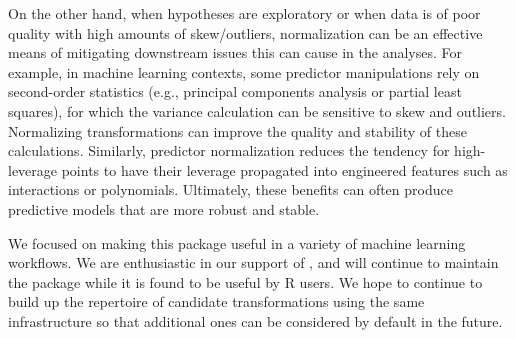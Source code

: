On the other hand, when hypotheses are exploratory or when data is of
poor quality with high amounts of skew/outliers, normalization can be an
effective means of mitigating downstream issues this can cause in the
analyses. For example, in machine learning contexts, some predictor
manipulations rely on second-order statistics (e.g., principal
components analysis or partial least squares), for which the variance
calculation can be sensitive to skew and outliers. Normalizing
transformations can improve the quality and stability of these
calculations. Similarly, predictor normalization reduces the tendency
for high-leverage points to have their leverage propagated into
engineered features such as interactions or polynomials. Ultimately,
these benefits can often produce predictive models that are more robust
and stable.

We focused on making this package useful in a variety of machine
learning workflows. We are enthusiastic in our support of
, and will continue to maintain the package while it
is found to be useful by R users. We hope to continue to build up the
repertoire of candidate transformations using the same infrastructure so
that additional ones can be considered by default in the future.



\address{%
Ryan A. Peterson\\
Department of Biostatistics and Informatics\\%
University of Colorado Anschutz Medical Campus 13001 East 17th Place
Aurora, Colorado 80045 ORCID: 0000-0002-4650-5798\\
%
\url{https://petersonr.github.io/}%
%
\\
}

